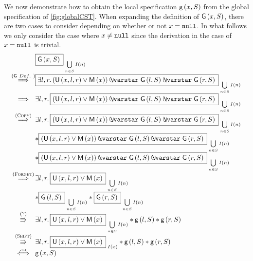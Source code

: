 We now demonstrate how to obtain the local specification $\textsf{g}\left(x, S\right)$ from the global specification of \fig\ref{fig:globalCST}. 
When expanding the definition of $\textsf{G}\left(x, S\right)$, there are two cases to consider depending on whether or not $x = \texttt{null}$. In what follows we only consider the case where $x \not= \texttt{null}$ since the derivation in the case of $x = \texttt{null}$ is trivial.
%
\[
\begin{array}{@{} c @{} l @{}}
	&\shared{\G{x}{S}}{\bigcup\limits_{n \in S} I(n)}  \\
	
	\stackrel{(\textsf{G}\ \defin)}{\implies} & \shared{\exsts{l, r} (\unmarked{x}{l}{r} \lor \marked{x}) \sepish \G{l}{S} \sepish \G{r}{S}}{\bigcup\limits_{n \in S} I(n)} \\
	
	\implies &   \exsts{l, r}  \shared{(\unmarked{x}{l}{r} \lor \marked{x}) \sepish \G{l}{S} \sepish \G{r}{S}}{\bigcup\limits_{n \in S} I(n)} \\
	
	\stackrel{(\textsc{Copy})}{\implies} &
	\exsts{l, r}  
	\shared{(\unmarked{x}{l}{r} \lor \marked{x})  \sepish \G{l}{S} \sepish \G{r}{S}}{\bigcup\limits_{n \in S} I(n)} \\
	& * \shared{(\unmarked{x}{l}{r} \lor \marked{x}) \sepish \G{l}{S} \sepish \G{r}{S}}{\bigcup\limits_{n \in S} I(n)} \\
	& * \shared{(\unmarked{x}{l}{r} \lor \marked{x})  \sepish \G{l}{S} \sepish \G{r}{S}}{\bigcup\limits_{n \in S} I(n)} \\
	
	
	\stackrel{(\textsc{Forget})}{\implies} &
	\exsts{l, r}  
	\shared{\unmarked{x}{l}{r} \lor \marked{x}  }{\bigcup\limits_{n \in S} I(n)} \\
	& * \shared{\G{l}{S}}{\bigcup\limits_{n \in S} I(n)} * \shared{\G{r}{S}}{\bigcup\limits_{n \in S} I(n)} \\
	
	
	
	\stackrel{(?)}{\semimplies} &
	\exsts{l, r}  
	\shared{\unmarked{x}{l}{r} \lor \marked{x}}{\bigcup\limits_{n \in S} I(n)} * \g{l}{S} * \g{r}{S}\\
	
	
	\stackrel{(\textsc{Shift})}{\semimplies} &
	\exsts{l, r}  
	\shared{\unmarked{x}{l}{r} \lor \marked{x} }{I(x)} * \g{l}{S} * \g{r}{S}\\
	
	
	\iffdef & \g{x}{S}
	
\end{array}
\]
